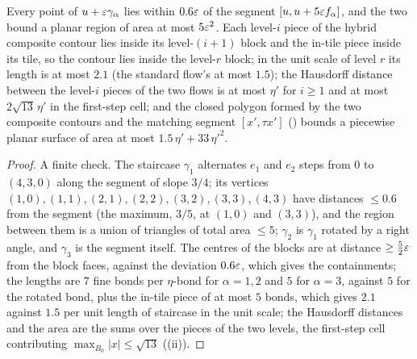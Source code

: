 \begin{lemma}\label{rot:lem:pair}
Every point of $u+\varepsilon\gamma_\alpha$ lies within $0.6\varepsilon$ of the segment $[u,u+5\varepsilon f_\alpha]$, and the two bound a planar region of area at most $5\varepsilon^2$. Each level-$i$ piece of the hybrid composite contour lies inside its level-$(i+1)$ block and the in-tile piece inside its tile, so the contour lies inside the level-$r$ block; in the unit scale of level $r$ its length is at most $2.1$ (the standard flow's at most $1.5$); the Hausdorff distance between the level-$i$ pieces of the two flows is at most $\eta'$ for $i\ge1$ and at most $2\sqrt{13}\,\eta'$ in the first-step cell; and the closed polygon formed by the two composite contours and the matching segment $[x',\tau x']$ () bounds a piecewise planar surface of area at most $1.5\,\eta'+33\,\eta'^2$.
\end{lemma}
\begin{proof}
A finite check. The staircase $\gamma_1$ alternates $e_1$ and $e_2$ steps from $0$ to $(4,3,0)$ along the segment of slope $3/4$; its vertices $(1,0),(1,1),(2,1),(2,2),(3,2),(3,3),(4,3)$ have distances $\le0.6$ from the segment (the maximum, $3/5$, at $(1,0)$ and $(3,3)$), and the region between them is a union of triangles of total area $\le5$; $\gamma_2$ is $\gamma_1$ rotated by a right angle, and $\gamma_3$ is the segment itself. The centres of the blocks are at distance $\ge\frac52\varepsilon$ from the block faces, against the deviation $0.6\varepsilon$, which gives the containments; the lengths are $7$ fine bonds per $\eta$-bond for $\alpha=1,2$ and $5$ for $\alpha=3$, against $5$ for the rotated bond, plus the in-tile piece of at most $5$ bonds, which gives $2.1$ against $1.5$ per unit length of staircase in the unit scale; the Hausdorff distances and the area are the sums over the pieces of the two levels, the first-step cell contributing $\max_{B_0}|x|\le\sqrt{13}$ ((ii)).
\end{proof}


